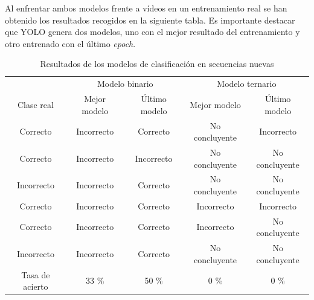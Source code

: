 \documentclass[12pt]{report} %
\begin{document}
    
    Al enfrentar ambos modelos frente a vídeos en un entrenamiento real se han
    obtenido los resultados recogidos en la siguiente tabla. Es importante
    destacar que YOLO genera dos modelos, uno con el mejor resultado del
    entrenamiento y otro entrenado con el último \textit{epoch}.

    \begin{table}[H]
        \center
        \begin{tabular}{@{}ccccc@{}}
            \toprule
             & \multicolumn{2}{c}{Modelo binario} & \multicolumn{2}{c}{Modelo ternario} \\
            \cmidrule(lr){2-3} \cmidrule(l){4-5}
            Clase real & Mejor modelo & Último modelo & Mejor modelo & Último modelo \\
            \midrule
            Correcto   & Incorrecto & Correcto   & No concluyente & Incorrecto \\
            Correcto   & Incorrecto & Incorrecto & No concluyente & No concluyente \\
            Incorrecto & Incorrecto & Correcto   & No concluyente & No concluyente \\
            Correcto   & Incorrecto & Correcto   & Incorrecto     & Incorrecto \\
            Correcto   & Incorrecto & Correcto   & Incorrecto     & No concluyente \\
            Incorrecto & Incorrecto & Correcto   & No concluyente & No concluyente \\
            \midrule
            Tasa de acierto & 33 \% & 50 \% & 0 \% & 0 \% \\
            \bottomrule
        \end{tabular}
        \caption{Resultados de los modelos de clasificación en secuencias nuevas}
    \end{table}
\end{document}
